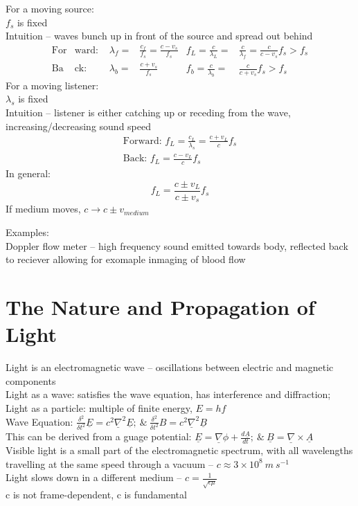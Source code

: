 \documentclass[a4paper, 11pt, fleqn, normalem]{report}
\begin{document}
For a moving source: \\
$f_{s}$ is fixed \\
Intuition -- waves bunch up in front of the source and spread out behind
\begin{align*}
    \text{For}&\text{ward: } & \lambda_{f} =& \frac{c_{f}}{f_{s}} = \frac{c - v_{s}}{f_{s}} & f_{L} = \frac{c}{\lambda_{L}} =& \frac{c}{\lambda_{f}} = \frac{c}{c - v_{s}}f_{s} > f_{s} \\
    \text{Ba}&\text{ck: } & \lambda_{b} =& \frac{c + v_{s}}{f_{s}} & f_{b} = \frac{c}{\lambda_{b}} =& \frac{c}{c + v_{s}}f_{s} > f_{s}
\end{align*}
For a moving listener: \\
$\lambda_{s}$ is fixed \\
Intuition -- listener is either catching up or receding from the wave, increasing/decreasing sound speed
\begin{gather*}
    \text{Forward: } f_{L} = \frac{c_{L}}{\lambda_{s}} = \frac{c + v_{L}}{c}f_{s} \\
    \text{Back: } f_{L} = \frac{c - v_{L}}{c}f_{s}
\end{gather*}
In general:
\begin{equation*}
    f_{L} = \frac{c \pm v_{L}}{c \pm v_{s}}f_{s}
\end{equation*}
If medium moves, $c \rightarrow c \pm v_{medium}$

Examples: \\
Doppler flow meter -- high frequency sound emitted towards body, reflected back to reciever allowing for exomaple inmaging of blood flow

\section{The Nature and Propagation of Light}
Light is an electromagnetic wave -- oscillations between electric and magnetic components \\
Light as a wave: satisfies the wave equation, has interference and diffraction; \\
Light as a particle: multiple of finite energy, $E = hf$ \\
Wave Equation: $\frac{\delta^{2}}{\delta t^{2}}\underline{E} = c^{2}\underline{\nabla}^{2}\underline{E};~\&~ \frac{\delta^{2}}{\delta t^{2}}B = c^{2}\underline{\nabla}^{2}\underline{B}$ \\
This can be derived from a guage potential: $\underline{E} = \underline{\nabla}\phi + \frac{d\underline{A}}{dt};~\&~\underline{B} = \underline{\nabla}\times\underline{A}$ \\
Visible light is a small part of the electromagnetic spectrum, with all wavelengths travelling at the same speed through a vacuum -- $c \approx 3\times10^{8}\:m\:s^{-1}$ \\
Light slows down in a different medium -- $c = \frac{1}{\sqrt{\epsilon\mu}}$\\
c is not frame-dependent, c is fundamental
\end{document}
